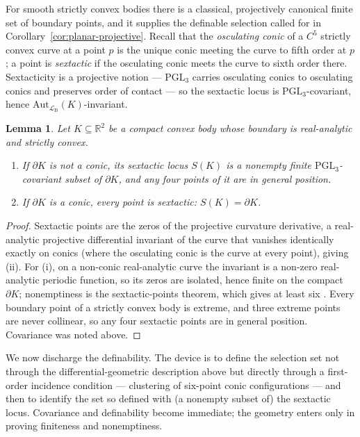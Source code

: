 \documentclass[11pt]{amsart}
\newtheorem{lemma}[theorem]{Lemma}
\theoremstyle{definition}
\newcommand{\R}{\mathbb{R}}
\newcommand{\LB}{\mathcal{L}_{\mathrm{B}}}
\newcommand{\PGL}{\mathrm{PGL}}
\begin{document}
For smooth strictly convex bodies there is a classical, projectively canonical
finite set of boundary points, and it supplies the definable selection called
for in Corollary~\ref{cor:planar-projective}. Recall that the
\emph{osculating conic} of a $C^5$ strictly convex curve at a point $p$ is the
unique conic meeting the curve to fifth order at $p$; a point is
\emph{sextactic} if the osculating conic meets the curve to sixth order there.
Sextacticity is a projective notion --- $\PGL_3$ carries osculating conics to
osculating conics and preserves order of contact --- so the sextactic locus is
$\PGL_3$-covariant, hence $\mathrm{Aut}_{\LB}(K)$-invariant.

\begin{lemma}\label{lem:sextactic}
Let $K\subseteq\R^2$ be a compact convex body whose boundary is real-analytic
and strictly convex.
\begin{enumerate}[label=\textup{(\roman*)}]
\item If $\partial K$ is not a conic, its sextactic locus $S(K)$ is a nonempty
finite $\PGL_3$-covariant subset of $\partial K$, and any four points of it are
in general position.
\item If $\partial K$ is a conic, every point is sextactic: $S(K)=\partial K$.
\end{enumerate}
\end{lemma}

\begin{proof}
Sextactic points are the zeros of the projective curvature derivative, a
real-analytic projective differential invariant of the curve that vanishes
identically exactly on conics (where the osculating conic is the curve at every
point), giving (ii). For (i), on a non-conic real-analytic curve the invariant
is a non-zero real-analytic periodic function, so its zeros are isolated, hence
finite on the compact $\partial K$; nonemptiness is the sextactic-points
theorem, which gives at least six \cite{Mukhopadhyaya09}. Every boundary point
of a strictly convex body is extreme, and three extreme points are never
collinear, so any four sextactic points are in general position. Covariance was
noted above.
\end{proof}

We now discharge the definability. The device is to define the selection set
not through the differential-geometric description above but directly through
a first-order incidence condition --- clustering of six-point conic
configurations --- and then to identify the set so defined with (a nonempty
subset of) the sextactic locus. Covariance and definability become immediate;
the geometry enters only in proving finiteness and nonemptiness.
\end{document}
